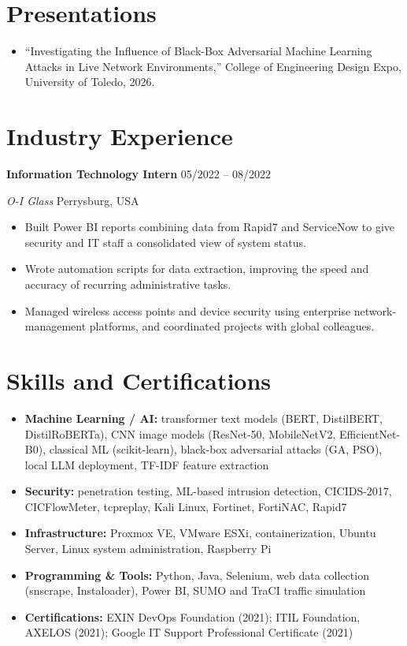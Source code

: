 \documentclass[11pt,a4paper]{article}
\newcommand{\entry}[4]{%
  \textbf{#1} \hfill #2\par
  \textit{#3} \hfill #4\par\vspace{1pt}}
\begin{document}
\section{Presentations}
\begin{itemize}
  \item ``Investigating the Influence of Black-Box Adversarial Machine Learning Attacks
        in Live Network Environments,'' College of Engineering Design Expo,
        University of Toledo, 2026.
\end{itemize}

\section{Industry Experience}
\entry{Information Technology Intern}{05/2022 -- 08/2022}
      {O-I Glass}{Perrysburg, USA}
\begin{itemize}
  \item Built Power BI reports combining data from Rapid7 and ServiceNow to give
        security and IT staff a consolidated view of system status.
  \item Wrote automation scripts for data extraction, improving the speed and
        accuracy of recurring administrative tasks.
  \item Managed wireless access points and device security using enterprise
        network-management platforms, and coordinated projects with global colleagues.
\end{itemize}

\section{Skills and Certifications}
\begin{itemize}
  \item \textbf{Machine Learning / AI:} transformer text models (BERT, DistilBERT,
        DistilRoBERTa), CNN image models (ResNet-50, MobileNetV2, EfficientNet-B0),
        classical ML (scikit-learn), black-box adversarial attacks (GA, PSO),
        local LLM deployment, TF-IDF feature extraction
  \item \textbf{Security:} penetration testing, ML-based intrusion detection,
        CICIDS-2017, CICFlowMeter, tcpreplay, Kali Linux, Fortinet, FortiNAC, Rapid7
  \item \textbf{Infrastructure:} Proxmox VE, VMware ESXi, containerization,
        Ubuntu Server, Linux system administration, Raspberry Pi
  \item \textbf{Programming \& Tools:} Python, Java, Selenium, web data collection
        (snscrape, Instaloader), Power BI, SUMO and TraCI traffic simulation
  \item \textbf{Certifications:} EXIN DevOps Foundation (2021); ITIL Foundation,
        AXELOS (2021); Google IT Support Professional Certificate (2021)
\end{itemize}
\end{document}
